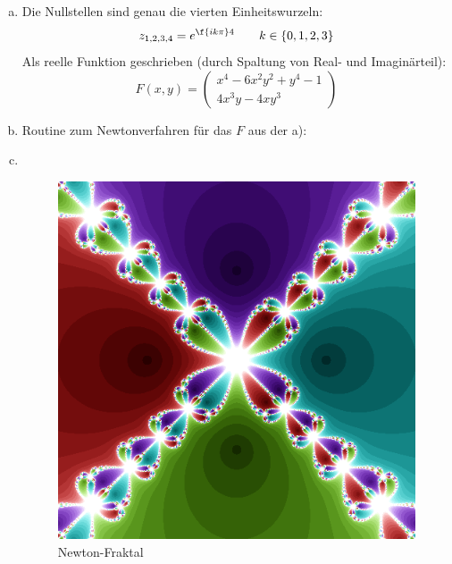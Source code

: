 \documentclass{mywork}
\begin{document}
\begin{aufgabe}
	
	\begin{enumerate}[a)]
		\item
			Die Nullstellen sind genau die vierten Einheitswurzeln:
			\[
				z_{1,2,3,4} = e^{\f {ik\pi}4} \qquad k \in \{0,1,2,3\}
			\]
			Als reelle Funktion geschrieben (durch Spaltung von Real- und Imaginärteil):
			\[
				F(x,y) = \begin{pmatrix}
					x^4 - 6x^2y^2 + y^4 - 1 \\
					4x^3y - 4xy^3
				\end{pmatrix}
			\]
		\item
			Routine zum Newtonverfahren für das $F$ aus der a):
			
			\newpage
		\item ~
			
			\newpage
			\begin{figure}[h]
				\centering
				\caption{Newton-Fraktal}
				\includegraphics[scale=0.8]{num1_13_4/fraktal.png}
			\end{figure}
	\end{enumerate}
\end{aufgabe}
\end{document}
